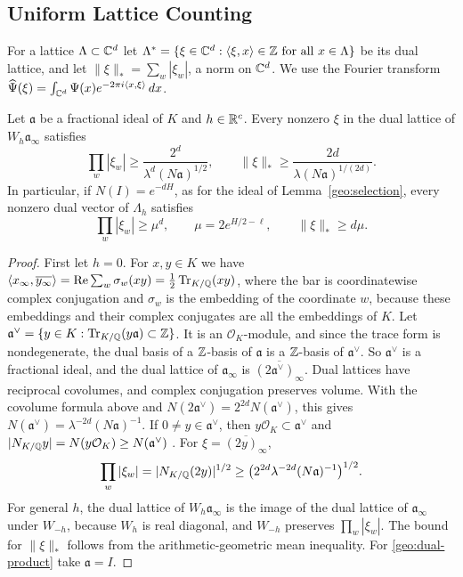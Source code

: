 \subsection{Uniform Lattice Counting}
For a lattice $\Lambda\subset\mathbb C^d$ let
$\Lambda^*=\{\xi\in\mathbb C^d:\langle\xi,x\rangle\in\mathbb Z\text{ for all
}x\in\Lambda\}$ be its dual lattice, and let
$\|\xi\|_*=\sum_w|\xi_w|$, a norm on $\mathbb C^d$. We use the Fourier
transform $\widehat\Psi(\xi)=\int_{\mathbb C^d}\Psi(x)e^{-2\pi i\langle
x,\xi\rangle}\,dx$.

\begin{lemma}\label{geo:dual}
Let $\mathfrak a$ be a fractional ideal of $K$ and $h\in\mathbb R^c$. Every
nonzero $\xi$ in the dual lattice of $W_h\mathfrak a_\infty$ satisfies
\[
 \prod_w|\xi_w|\ge\frac{2^d}{\lambda^d(N\mathfrak a)^{1/2}},
 \qquad
 \|\xi\|_*\ge\frac{2d}{\lambda(N\mathfrak a)^{1/(2d)}}.
\]
In particular, if $N(I)=e^{-dH}$, as for the ideal of
Lemma~\ref{geo:selection}, every nonzero dual vector of $\Lambda_h$
satisfies
\begin{equation}\label{geo:dual-product}
 \prod_w|\xi_w|\ge\mu^d,\qquad \mu=2e^{H/2-\ell},\qquad
 \|\xi\|_*\ge d\mu.
\end{equation}
\end{lemma}

\begin{proof}
First let $h=0$. For $x,y\in K$ we have
$\langle x_\infty,\overline{y_\infty}\rangle
=\operatorname{Re}\sum_w\sigma_w(xy)=\tfrac12\operatorname{Tr}_{K/\mathbb Q}(xy)$, where the
bar is coordinatewise complex conjugation and $\sigma_w$ is the
embedding of the coordinate $w$, because these embeddings and their
complex conjugates are all the embeddings of $K$. Let
$\mathfrak a^\vee=\{y\in K:\operatorname{Tr}_{K/\mathbb Q}(y\mathfrak a)\subset\mathbb Z\}$. It is an
$\mathcal O_K$-module, and since the trace form is nondegenerate, the
dual basis of a $\mathbb Z$-basis of $\mathfrak a$ is a $\mathbb Z$-basis of
$\mathfrak a^\vee$. So $\mathfrak a^\vee$ is a fractional ideal, and
the dual lattice of $\mathfrak a_\infty$ is
$\overline{(2\mathfrak a^\vee)_\infty}$. Dual lattices have reciprocal
covolumes, and complex conjugation preserves volume. With the covolume
formula above and $N(2\mathfrak a^\vee)=2^{2d}N(\mathfrak a^\vee)$, this
gives $N(\mathfrak a^\vee)=\lambda^{-2d}(N\mathfrak a)^{-1}$. If
$0\ne y\in\mathfrak a^\vee$, then $y\mathcal O_K\subset\mathfrak a^\vee$
and $|N_{K/\mathbb Q}y|=N(y\mathcal O_K)\ge N(\mathfrak a^\vee)$
\cite[Propositions~4.1 and~4.2]{MilneANT}. For
$\xi=\overline{(2y)_\infty}$,
\[
 \prod_w|\xi_w|=|N_{K/\mathbb Q}(2y)|^{1/2}
 \ge\bigl(2^{2d}\lambda^{-2d}(N\mathfrak a)^{-1}\bigr)^{1/2}.
\]
For general $h$, the dual lattice of $W_h\mathfrak a_\infty$ is the
image of the dual lattice of $\mathfrak a_\infty$ under $W_{-h}$,
because $W_h$ is real diagonal, and $W_{-h}$ preserves
$\prod_w|\xi_w|$. The bound for $\|\xi\|_*$ follows from the
arithmetic-geometric mean inequality. For \eqref{geo:dual-product} take
$\mathfrak a=I$.
\end{proof}

